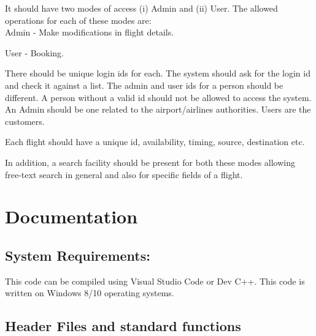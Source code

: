 \documentclass[12pt]{article}
\begin{document}
It should have two modes of access (i) Admin and (ii) User. The allowed operations for
each of these modes are:\\
\indent Admin - Make modifications in flight details.

User - Booking.

There should be unique login ids for each. The system should ask for the login id and
check it against a list. The admin and user ids for a person should be different. A person
without a valid id should not be allowed to access the system. An Admin should be one
related to the airport/airlines authorities. Users are the customers.

Each flight should have a unique id, availability, timing, source, destination etc.

In addition, a search facility should be present for both these modes allowing free-text
search in general and also for specific fields of a flight.

\section{Documentation}
\subsection{System Requirements:}
This code can be compiled using Visual Studio Code or Dev C++. This code is written on Windows 8/10 operating systems.

\subsection{Header Files and standard functions}

\end{document}
